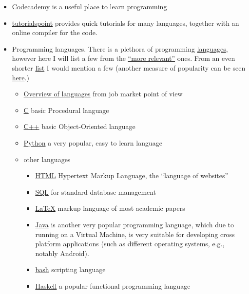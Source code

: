 \documentclass{article}
\begin{document}
\begin{itemize}
    \item \href{https://www.codecademy.com/}{Codecademy} is a useful place to learn programming
    
    \item \href{https://www.tutorialspoint.com/computer_programming_tutorials.htm}{tutorialspoint} provides quick tutorials for many languages, together with an online compiler for the code.

    
    \item Programming languages. There is a plethora of programming \href{https://www.levenez.com/lang/}{languages}, however here I will list a few from the \href{http://rigaux.org/language-study/diagram-light.pdf}{``more relevant''} ones. From an even shorter \href{https://www.computerscience.org/resources/computer-programming-languages/}{list} I would mention a few (another measure of popularity can be seen \href{https://www.tiobe.com/tiobe-index/}{here}.)
    \begin{itemize}
        \item \href{https://www.youtube.com/watch?v=poJfwre2PIs}{Overview of languages} from job market point of view
        \item \href{https://en.wikipedia.org/wiki/C_(programming_language)}{C} basic Procedural language 
        \item \href{https://isocpp.org/}{C++} basic Object-Oriented language
        \item \href{https://www.python.org/}{Python} a very popular, easy to learn language
        \item other languages
        \begin{itemize}
        \item \href{https://en.wikipedia.org/wiki/HTML}{HTML} Hypertext Markup Language, the ``language of websites''
        \item \href{https://en.wikipedia.org/wiki/SQL}{SQL} for standard database management
        \item \href{https://www.latex-project.org/}{LaTeX} markup language of most academic papers
        \item \href{https://en.wikipedia.org/wiki/Java_(programming_language)}{Java} is another very popular programming language, which due to running on a Virtual Machine, is very suitable for developing cross platform applications (such as different operating systems, e.g., notably Android).
        \item \href{https://www.gnu.org/software/bash/}{bash} scripting language
        \item \href{https://www.haskell.org/}{Haskell} a popular functional programming language
        \end{itemize}
    \end{itemize}
    

\end{itemize}
\end{document}
